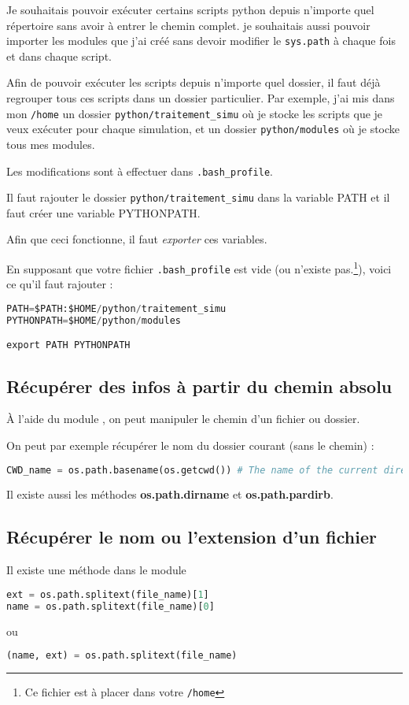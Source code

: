 \documentclass[a4paper,twoside]{article}
\begin{document}
Je souhaitais pouvoir exécuter certains scripts python depuis  n'importe quel répertoire sans avoir à entrer le chemin complet. je  souhaitais aussi pouvoir importer les modules que j'ai créé sans  devoir modifier le \texttt{sys.path} à chaque fois et dans chaque  script.

Afin de pouvoir exécuter les scripts depuis n'importe quel dossier,  il faut déjà regrouper tous ces scripts dans un dossier particulier.  Par exemple, j'ai mis dans mon \texttt{/home} un dossier \texttt {python/traitement\_simu} où je stocke les scripts que je veux  exécuter pour chaque simulation, et un dossier \texttt{python/modules} où je stocke tous mes modules.

Les modifications sont à effectuer dans \texttt{.bash\_profile}.

Il faut rajouter le dossier \texttt{python/traitement\_simu} dans la  variable PATH et il faut créer une variable PYTHONPATH.

\begin{attention}
Afin que ceci fonctionne, il faut \emph{exporter} ces variables.
\end{attention}

En supposant que votre fichier \texttt{.bash\_profile} est vide (ou  n'existe pas.\footnote{Ce fichier est à placer dans votre \texttt{/home}}), voici ce qu'il faut rajouter :
\begin{lstlisting}[language=python]
PATH=$PATH:$HOME/python/traitement_simu
PYTHONPATH=$HOME/python/modules

export PATH PYTHONPATH
\end{lstlisting}

\subsection{Récupérer des infos à partir du chemin absolu}
À l'aide du module , on peut manipuler le chemin d'un fichier ou dossier. 

On peut par exemple récupérer le nom du dossier courant (sans le chemin) :
\begin{lstlisting}[language=python]
CWD_name = os.path.basename(os.getcwd()) # The name of the current directory
\end{lstlisting}

Il existe aussi les méthodes \textbf{os.path.dirname} et \textbf{os.path.pardirb}.

\subsection{Récupérer le nom ou l'extension d'un fichier}
Il existe une méthode dans le module 
\begin{lstlisting}[language=python]
ext = os.path.splitext(file_name)[1]
name = os.path.splitext(file_name)[0]
\end{lstlisting}
ou 
\begin{lstlisting}[language=python]
(name, ext) = os.path.splitext(file_name)
\end{lstlisting}
\end{document}

